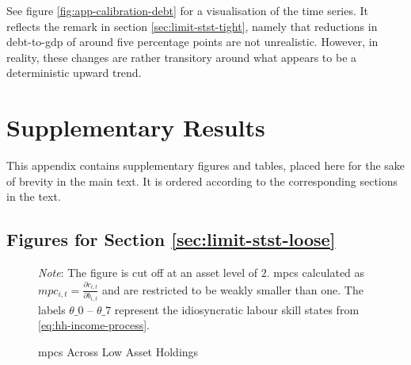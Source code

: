 \documentclass[a4paper,12pt]{article} %
\numberwithin{equation}{section} %
\numberwithin{figure}{section}
\numberwithin{table}{section}
\begin{document}
\begin{refsection}
\begin{appendices}
See figure \ref{fig:app-calibration-debt} for a visualisation of the time series. It reflects the remark in section \ref{sec:limit-stst-tight}, namely that reductions in debt-to-\Gls{gdp} of around five percentage points are not unrealistic. However, in reality, these changes are rather transitory around what appears to be a deterministic upward trend.

\section{Supplementary Results}
\label{sec-app:figures}

This appendix contains supplementary figures and tables, placed here for the sake of brevity in the main text. It is ordered according to the corresponding sections in the text.

\subsection{Figures for Section \ref{sec:limit-stst-loose}}
\label{sec-app:figures-limit-loose}

\begin{figure}[H]
    \centering
    \caption{\Gls{mpc}s Across Low Asset Holdings}
    \label{fig:baseline-limit-initial-mpcs}
    

    \vspace{10pt}
    
    \begin{minipage}{0.75\textwidth}
    \footnotesize
    \textit{Note}: The figure is cut off at an asset level of $2$. \Gls{mpc}s calculated as $mpc_{i,t} = \frac{\partial c_{i,t}}{\partial b_{i,t}}$ and are restricted to be weakly smaller than one. The labels $\theta\_0$ -- $\theta\_7$ represent the idiosyncratic labour skill states from \eqref{eq:hh-income-process}.
    \end{minipage}
\end{figure}


\end{appendices}
\end{refsection}
\end{document}
